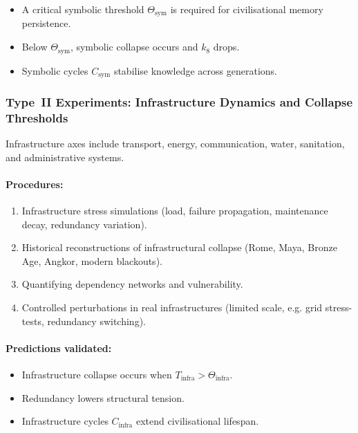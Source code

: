 \begin{itemize}
    \item A critical symbolic threshold $\Theta_{\mathrm{sym}}$ is required 
          for civilisational memory persistence.
    \item Below $\Theta_{\mathrm{sym}}$, symbolic collapse occurs and $k_8$ drops.
    \item Symbolic cycles $C_{\mathrm{sym}}$ stabilise knowledge across generations.
\end{itemize}



\subsubsection{Type~II Experiments: Infrastructure Dynamics and Collapse Thresholds}

Infrastructure axes include transport, energy, communication, water,
sanitation, and administrative systems.

\paragraph{Procedures:}

\begin{enumerate}
    \item Infrastructure stress simulations (load, failure propagation,
          maintenance decay, redundancy variation).
    \item Historical reconstructions of infrastructural collapse 
          (Rome, Maya, Bronze Age, Angkor, modern blackouts).
    \item Quantifying dependency networks and vulnerability.
    \item Controlled perturbations in real infrastructures (limited scale,
          e.g. grid stress-tests, redundancy switching).
\end{enumerate}

\paragraph{Predictions validated:}

\begin{itemize}
    \item Infrastructure collapse occurs when 
          $T_{\mathrm{infra}} > \Theta_{\mathrm{infra}}$.
    \item Redundancy lowers structural tension.
    \item Infrastructure cycles $C_{\mathrm{infra}}$ extend civilisational lifespan.
\end{itemize}



